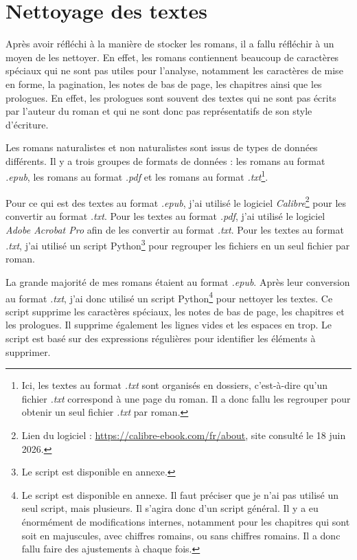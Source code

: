 \section{Nettoyage des textes}

Après avoir réfléchi à la manière de stocker les romans, il a fallu réfléchir à un moyen de les nettoyer. En effet, les romans contiennent beaucoup de caractères spéciaux qui ne sont pas utiles pour l'analyse, notamment les caractères de mise en forme, la pagination, les notes de bas de page, les chapitres ainsi que les prologues. En effet, les prologues sont souvent des textes qui ne sont pas écrits par l'auteur du roman et qui ne sont donc pas représentatifs de son style d'écriture.

Les romans naturalistes et non naturalistes sont issus de types de données différents. Il y a trois groupes de formats de données : les romans au format \textsl{.epub}, les romans au format \textsl{.pdf} et les romans au format \textsl{.txt}\footnote{Ici, les textes au format \textsl{.txt} sont organisés en dossiers, c'est-à-dire qu'un fichier \textsl{.txt} correspond à une page du roman. Il a donc fallu les regrouper pour obtenir un seul fichier \textsl{.txt} par roman.}.

Pour ce qui est des textes au format \textsl{.epub}, j'ai utilisé le logiciel \textsl{Calibre}\footnote{Lien du logiciel : \href{https://calibre-ebook.com/fr/about}{https://calibre-ebook.com/fr/about}, site consulté le 18 juin 2026.} pour les convertir au format \textsl{.txt}. Pour les textes au format \textsl{.pdf}, j'ai utilisé le logiciel \textsl{Adobe Acrobat Pro} afin de les convertir au format \textsl{.txt}. Pour les textes au format \textsl{.txt}, j'ai utilisé un script Python\footnote{Le script est disponible en annexe.} pour regrouper les fichiers en un seul fichier par roman.

La grande majorité de mes romans étaient au format \textsl{.epub}. Après leur conversion au format \textsl{.txt}, j'ai donc utilisé un script Python\footnote{Le script est disponible en annexe. Il faut préciser que je n'ai pas utilisé un seul script, mais plusieurs. Il s'agira donc d'un script général. Il y a eu énormément de modifications internes, notamment pour les chapitres qui sont soit en majuscules, avec chiffres romains, ou sans chiffres romains. Il a donc fallu faire des ajustements à chaque fois.} pour nettoyer les textes. Ce script supprime les caractères spéciaux, les notes de bas de page, les chapitres et les prologues. Il supprime également les lignes vides et les espaces en trop. Le script est basé sur des expressions régulières pour identifier les éléments à supprimer.

